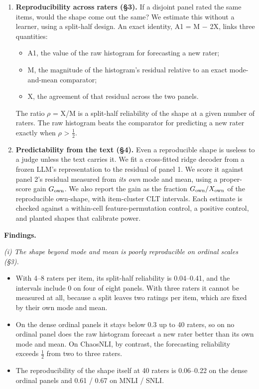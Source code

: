 \documentclass{article}
\providecommand{\tightlist}{\setlength{\itemsep}{0pt}\setlength{\parskip}{0pt}}
\begin{document}
\begin{enumerate}
\def\labelenumi{\arabic{enumi}.}
\tightlist
\item
  \textbf{Reproducibility across raters (\S{}3).} If a disjoint panel rated the same items, would the shape come out the same? We estimate this without a learner, using a split-half design. An exact identity, A1 = M $-$ 2X, links three quantities:

  \begin{itemize}
  \tightlist
  \item
    A1, the value of the raw histogram for forecasting a new rater;
  \item
    M, the magnitude of the histogram's residual relative to an exact mode-and-mean comparator;
  \item
    X, the agreement of that residual across the two panels.
  \end{itemize}

  The ratio $\rho$ = X/M is a split-half reliability of the shape at a given number of raters. The raw histogram beats the comparator for predicting a new rater exactly when $\rho$ \textgreater{} $\tfrac12$.
\item
  \textbf{Predictability from the text (\S{}4).} Even a reproducible shape is useless to a judge unless the text carries it. We fit a cross-fitted ridge decoder from a frozen LLM's representation to the residual of panel 1. We score it against panel 2's residual measured from \emph{its own} mode and mean, using a proper-score gain \(G_{\rm own}\). We also report the gain as the fraction \(G_{\rm own}/X_{\rm own}\) of the reproducible own-shape, with item-cluster CLT intervals. Each estimate is checked against a within-cell feature-permutation control, a positive control, and planted shapes that calibrate power.
\end{enumerate}

\textbf{Findings.}

\emph{(i) The shape beyond mode and mean is poorly reproducible on ordinal scales (\S{}3).}

\begin{itemize}
\tightlist
\item
  With 4--8 raters per item, its split-half reliability is 0.04--0.41, and the intervals include 0 on four of eight panels. With three raters it cannot be measured at all, because a split leaves two ratings per item, which are fixed by their own mode and mean.
\item
  On the dense ordinal panels it stays below 0.3 up to 40 raters, so on no ordinal panel does the raw histogram forecast a new rater better than its own mode and mean. On ChaosNLI, by contrast, the forecasting reliability exceeds $\tfrac12$ from two to three raters.
\item
  The reproducibility of the shape itself at 40 raters is 0.06--0.22 on the dense ordinal panels and 0.61 / 0.67 on MNLI / SNLI.
\end{itemize}
\end{document}
